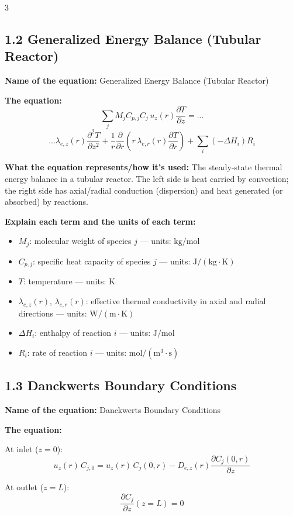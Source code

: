 \documentclass[8pt]{extarticle}
\begin{document}
\begin{multicols*}{3}
\subsection*{1.2 Generalized Energy Balance (Tubular Reactor)}

\textbf{Name of the equation:} Generalized Energy Balance (Tubular Reactor)

\textbf{The equation:}
\[
\sum_j M_j C_{p,j} C_j\,u_z(r)\frac{\partial T}{\partial z}
=...
\]
\[
...\lambda_{e,z}(r)\frac{\partial^2 T}{\partial z^2}
+
\frac{1}{r}\frac{\partial}{\partial r}\left(r\,\lambda_{e,r}(r)\frac{\partial T}{\partial r}\right)
+
\sum_i (-\Delta H_i)R_i
\]

\textbf{What the equation represents/how it's used:} The steady-state thermal energy balance in a tubular reactor. The left side is heat carried by convection; the right side has axial/radial conduction (dispersion) and heat generated (or absorbed) by reactions.

\textbf{Explain each term and the units of each term:}
\begin{itemize}
\item \(M_j\): molecular weight of species \(j\) --- units: \(\mathrm{kg/mol}\)
\item \(C_{p,j}\): specific heat capacity of species \(j\) --- units: \(\mathrm{J/(kg\cdot K)}\)
\item \(T\): temperature --- units: \(\mathrm{K}\)
\item \(\lambda_{e,z}(r)\), \(\lambda_{e,r}(r)\): effective thermal conductivity in axial and radial directions --- units: \(\mathrm{W/(m\cdot K)}\)
\item \(\Delta H_i\): enthalpy of reaction \(i\) --- units: \(\mathrm{J/mol}\)
\item \(R_i\): rate of reaction \(i\) --- units: \(\mathrm{mol/(m^3\cdot s)}\)
\end{itemize}

\subsection*{1.3 Danckwerts Boundary Conditions}

\textbf{Name of the equation:} Danckwerts Boundary Conditions

\textbf{The equation:}

At inlet (\(z=0\)):
\[
u_z(r)\,C_{j,0}
=
u_z(r)\,C_j(0,r)
-
D_{e,z}(r)\frac{\partial C_j(0,r)}{\partial z}
\]

At outlet (\(z=L\)):
\[
\frac{\partial C_j}{\partial z}(z=L)=0
\]


\end{multicols*}
\end{document}

